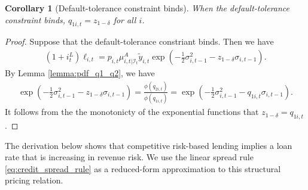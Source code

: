 \documentclass[12pt]{article}
\newtheorem{corollary}{Corollary}[section]
\numberwithin{equation}{section}
\begin{document}
\begin{appendix}
\begin{corollary}[Default-tolerance constraint binds]\label{corollary:default_tolerance_constraint_binds}
    When the default-tolerance constraint binds, $q_{1i,t} = z_{1-\delta}$ for all $i$.
\end{corollary}
\begin{proof}
    Suppose that the default-tolerance constriant binds. Then we have
    \begin{align}\label{eq:default_tolerance_constraint_binds}
        (1+i^L_{t})\ell_{i,t} = p_{i,t}\mu^A_{i, t|\mathcal{I}_t}\tilde{y}_{i,t}\exp\left(-\frac{1}{2}\sigma^2_{i,t-1} - z_{1-\delta}\sigma_{i,t-1}\right).
    \end{align}
    By Lemma \ref{lemma:pdf_q1_q2}, we have
    \begin{align*}
        \exp\left(-\frac{1}{2}\sigma^2_{i,t-1} - z_{1-\delta}\sigma_{i,t-1}\right) = \frac{\phi(q_{2i,t})}{\phi(q_{1i,t})} = \exp\left(-\frac{1}{2}\sigma^2_{i,t-1} - q_{1i,t}\sigma_{i,t-1}\right).
    \end{align*}
    It follows from the the monotonicty of the exponential functions that $z_{1-\delta} = q_{1i,t}$.
\end{proof}

The derivation below shows that competitive risk-based lending implies a loan rate that is increasing in revenue risk. We use the linear spread rule \eqref{eq:credit_spread_rule} as a reduced-form approximation to this structural pricing relation.


\end{appendix}
\end{document}
